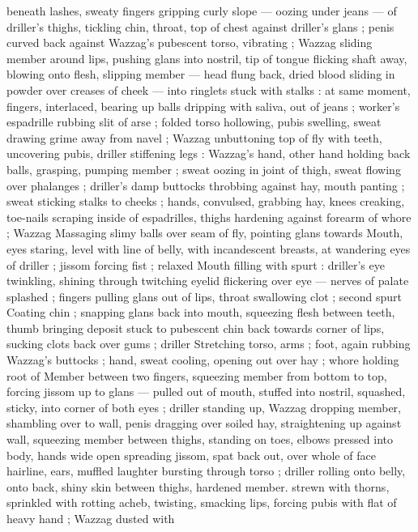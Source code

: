 beneath lashes, sweaty fingers gripping curly slope --- oozing under 
jeans --- of driller's thighs, tickling chin, throat, top of chest against 
driller's glans ; penis curved back against Wazzag's pubescent torso, 
vibrating ; Wazzag sliding member around lips, pushing glans into 
nostril, tip of tongue flicking shaft away, blowing onto flesh, slipping 
member --- head flung back, dried blood sliding in powder over 
creases of cheek --- into ringlets stuck with stalks : at same moment, 
fingers, interlaced, bearing up balls dripping with saliva, out of jeans 
; worker's espadrille rubbing slit of arse ; folded torso hollowing, 
pubis swelling, sweat drawing grime away from navel ; Wazzag 
unbuttoning top of fly with teeth, uncovering pubis, driller stiffening 
legs : Wazzag's hand, other hand holding back balls, grasping, 
pumping member ; sweat oozing in joint of thigh, sweat flowing over 
phalanges ; driller's damp buttocks throbbing against hay, mouth 
panting ; sweat sticking stalks to cheeks ; hands, convulsed, 
grabbing hay, knees creaking, toe-nails scraping inside of 
espadrilles, thighs hardening against forearm of whore ; Wazzag 
Massaging slimy balls over seam of fly, pointing glans towards 
Mouth, eyes staring, level with line of belly, with incandescent 
breasts, at wandering eyes of driller ; jissom forcing fist ; relaxed 
Mouth filling with spurt : driller's eye twinkling, shining through 
twitching eyelid flickering over eye --- nerves of palate splashed ; 
fingers pulling glans out of lips, throat swallowing clot ; second spurt 
Coating chin ; snapping glans back into mouth, squeezing flesh 
between teeth, thumb bringing deposit stuck to pubescent chin back 
towards corner of lips, sucking clots back over gums ; driller 
Stretching torso, arms ; foot, again rubbing Wazzag's buttocks ; 
hand, sweat cooling, opening out over hay ; whore holding root of 
Member between two fingers, squeezing member from bottom to top, 
forcing jissom up to glans --- pulled out of mouth, stuffed into 
nostril, squashed, sticky, into corner of both eyes ; driller standing 
up, Wazzag dropping member, shambling over to wall, penis dragging 
over soiled hay, straightening up against wall, squeezing member 
between thighs, standing on toes, elbows pressed into body, hands 
wide open spreading jissom, spat back out, over whole of face 
hairline, ears, muffled laughter bursting through torso ; driller rolling 
onto belly, onto back, shiny skin between thighs, hardened member. 
strewn with thorns, sprinkled with rotting acheb, twisting, smacking 
lips, forcing pubis with flat of heavy hand ; Wazzag dusted with 
